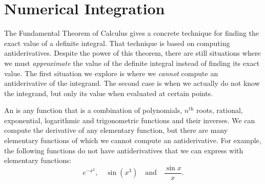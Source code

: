 \section{Numerical Integration}\label{sec:numerical_integration}

The Fundamental Theorem of Calculus gives a concrete technique for finding the exact value of a definite integral. That technique is based on computing antiderivatives. Despite the power of this theorem, there are still situations where we must \textit{approximate} the value of the definite integral instead of finding its exact value. The first situation we explore is where we \textit{cannot} compute an antiderivative of the integrand. The second case is when we actually do not know the integrand, but only its value when evaluated at certain points. %
%
\bigskip

%
An  is any function that is a combination of polynomials, $n^{\text{th}}$ roots, rational, exponential, logarithmic and trigonometric functions and their inverses. We can compute the derivative of any elementary function, but there are many elementary functions of which we cannot compute an antiderivative. For example, the following functions do not have antiderivatives that we can express with elementary functions:
\[e^{-x^2}, \quad \sin(x^3)\quad \text{and} \quad \frac{\sin x}{x}.\]


